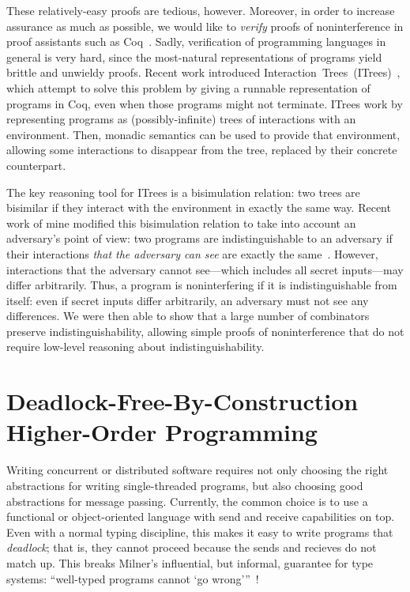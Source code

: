 \documentclass{article}
\theoremstyle{definition}
\begin{document}
These relatively-easy proofs are tedious, however.
Moreover, in order to increase assurance as much as possible, we would like to \emph{verify} proofs of noninterference in proof assistants such as Coq~\cite{Coq04}.
Sadly, verification of programming languages in general is very hard, since the most-natural representations of programs yield brittle and unwieldy proofs.
Recent work introduced Interaction~Trees~(ITrees)~\citep{XiaZHHMPZ20}, which attempt to solve this problem by giving a runnable representation of programs in Coq, even when those programs might not terminate.
ITrees work by representing programs as (possibly-infinite) trees of interactions with an environment.
Then, monadic semantics can be used to provide that environment, allowing some interactions to disappear from the tree, replaced by their concrete counterpart.

The key reasoning tool for ITrees is a bisimulation relation: two trees are bisimilar if they interact with the environment in exactly the same way.
Recent work of mine modified this bisimulation relation to take into account an adversary's point of view: two programs are indistinguishable to an adversary if their interactions \emph{that the adversary can see} are exactly the same~\citep{SilverHHCZ22}.
However, interactions that the adversary cannot see---which includes all secret inputs---may differ arbitrarily.
Thus, a program is noninterfering if it is indistinguishable from itself: even if secret inputs differ arbitrarily, an adversary must not see any differences.
We were then able to show that a large number of combinators preserve indistinguishability, allowing simple proofs of noninterference that do not require low-level reasoning about indistinguishability.

\section*{Deadlock-Free-By-Construction Higher-Order Programming}

Writing concurrent or distributed software requires not only choosing the right abstractions for writing single-threaded programs, but also choosing good abstractions for message passing.
Currently, the common choice is to use a functional or object-oriented language with send and receive capabilities on top.
Even with a normal typing discipline, this makes it easy to write programs that \emph{deadlock}; that is, they cannot proceed because the sends and recieves do not match up.
This breaks Milner's influential, but informal, guarantee for type systems: ``well-typed programs cannot `go wrong'\hspace{.2em}''~\citep{Milner78}!
\end{document}
